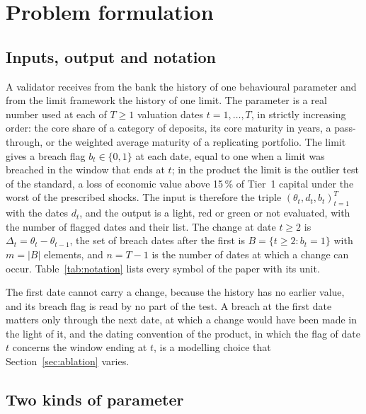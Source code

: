 \section{Problem formulation}
\label{sec:problem}

\subsection{Inputs, output and notation}
\label{sec:problem-inputs}

A validator receives from the bank the history of one behavioural parameter and from the limit framework the history of one limit. The parameter is a real number used at each of $T\ge 1$ valuation dates $t=1,\dots,T$, in strictly increasing order: the core share of a category of deposits, its core maturity in years, a pass-through, or the weighted average maturity of a replicating portfolio. The limit gives a breach flag $b_t\in\{0,1\}$ at each date, equal to one when a limit was breached in the window that ends at $t$; in the product the limit is the outlier test of the standard, a loss of economic value above 15\,\% of Tier~1 capital under the worst of the prescribed shocks. The input is therefore the triple $(\theta_t,d_t,b_t)_{t=1}^{T}$ with the dates $d_t$, and the output is a light, red or green or not evaluated, with the number of flagged dates and their list. The change at date $t\ge 2$ is $\Delta_t=\theta_t-\theta_{t-1}$, the set of breach dates after the first is $B=\{t\ge 2: b_t=1\}$ with $m=|B|$ elements, and $n=T-1$ is the number of dates at which a change can occur. Table~\ref{tab:notation} lists every symbol of the paper with its unit.

The first date cannot carry a change, because the history has no earlier value, and its breach flag is read by no part of the test. A breach at the first date matters only through the next date, at which a change would have been made in the light of it, and the dating convention of the product, in which the flag of date $t$ concerns the window ending at $t$, is a modelling choice that Section~\ref{sec:ablation} varies.



\subsection{Two kinds of parameter}
\label{sec:problem-kinds}

